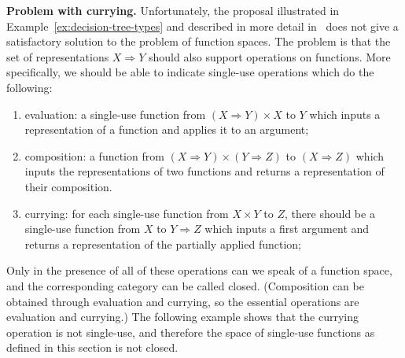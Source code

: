 \textbf{Problem with currying.}
Unfortunately, the proposal illustrated in Example~\ref{ex:decision-tree-types} and described in more detail in~\cite{stefanski-phd}  does not give a satisfactory solution to the problem of function spaces. The problem is that the set of representations $X \Rightarrow Y$ should  also support operations on functions. More specifically, we should be able to indicate single-use operations which do the following:
\begin{enumerate}
    \item evaluation: a single-use function from $(X \Rightarrow Y) \times X$ to $Y$ which inputs a representation of a function and applies it to an argument;
    \item composition: a function from $(X \Rightarrow Y) \times (Y \Rightarrow Z)$ to $(X \Rightarrow Z)$ which inputs the representations of two functions and returns a representation of their composition.
    \item currying: for each single-use function from  $ X \times Y $ to $Z$, there should be a single-use function from $X$ to $Y \Rightarrow Z$ which inputs a first argument and returns a representation of the  partially applied function;
\end{enumerate}
Only in the presence of all of these operations can we speak of a function space, and the corresponding category can be called closed. (Composition can be obtained through evaluation and currying, so the essential operations are evaluation and currying.) The following example shows that the currying operation is not single-use, and therefore the space of single-use functions as defined in this section is not closed. 


